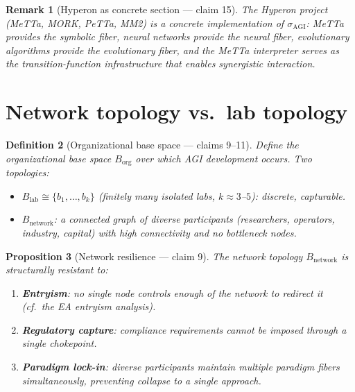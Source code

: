 \documentclass[11pt,a4paper]{article}
\newtheorem{definition}{Definition}[section]
\newtheorem{proposition}[definition]{Proposition}
\newtheorem{remark}[definition]{Remark}
\begin{document}
\begin{remark}[Hyperon as concrete section --- claim 15]
The Hyperon project (MeTTa, MORK, PeTTa, MM2) is a concrete
implementation of $\sigma_{\text{AGI}}$: MeTTa provides the symbolic
fiber, neural networks provide the neural fiber, evolutionary
algorithms provide the evolutionary fiber, and the MeTTa interpreter
serves as the transition-function infrastructure that enables
synergistic interaction.
\end{remark}

\section{Network topology vs.\ lab topology}
\label{sec:topology}

\begin{definition}[Organizational base space --- claims 9--11]
\label{def:org-space}
Define the organizational base space $B_{\text{org}}$ over which
AGI development occurs. Two topologies:
\begin{itemize}
\item $B_{\text{lab}} \cong \{b_1, \ldots, b_k\}$ (finitely many
  isolated labs, $k \approx 3$--$5$): discrete, capturable.
\item $B_{\text{network}}$: a connected graph of diverse participants
  (researchers, operators, industry, capital) with high connectivity
  and no bottleneck nodes.
\end{itemize}
\end{definition}

\begin{proposition}[Network resilience --- claim 9]
\label{prop:resilience}
The network topology $B_{\text{network}}$ is structurally resistant to:
\begin{enumerate}
\item \textbf{Entryism}: no single node controls enough of the network
  to redirect it (cf.\ the EA entryism analysis).
\item \textbf{Regulatory capture}: compliance requirements cannot be
  imposed through a single chokepoint.
\item \textbf{Paradigm lock-in}: diverse participants maintain
  multiple paradigm fibers simultaneously, preventing collapse to
  a single approach.
\end{enumerate}
\end{proposition}
\end{document}
